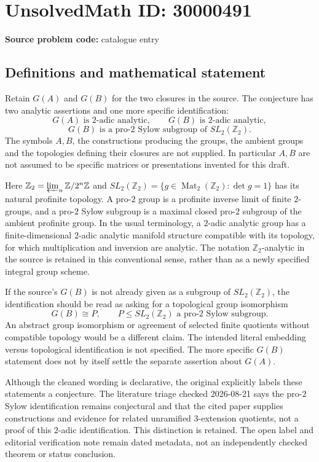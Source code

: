 \documentclass[11pt]{article}
\newcommand{\Z}{\mathbb{Z}}
\begin{document}
\section*{UnsolvedMath ID: 30000491}
\textbf{Source problem code:} catalogue entry
\subsection{Definitions and mathematical statement}
Retain \(G(A)\) and \(G(B)\) for the two closures in the source. The conjecture has two analytic assertions and one more specific identification:
\[
 G(A)\text{ is }2\text{-adic analytic},\qquad
 G(B)\text{ is }2\text{-adic analytic},
\]
\[
 G(B)\text{ is a pro-}2\text{ Sylow subgroup of }SL_2(\Z_2).
\]
The symbols \(A,B\), the constructions producing the groups, the ambient groups and the topologies defining their closures are not supplied. In particular \(A,B\) are not assumed to be specific matrices or presentations invented for this draft.

Here \(\Z_2=\varprojlim_n\Z/2^n\Z\) and \(SL_2(\Z_2)=\{g\in\operatorname{Mat}_2(\Z_2):\det g=1\}\) has its natural profinite topology. A pro-\(2\) group is a profinite inverse limit of finite \(2\)-groups, and a pro-\(2\) Sylow subgroup is a maximal closed pro-\(2\) subgroup of the ambient profinite group. In the usual terminology, a \(2\)-adic analytic group has a finite-dimensional \(2\)-adic analytic manifold structure compatible with its topology, for which multiplication and inversion are analytic. The notation \(\Z_2\)-analytic in the source is retained in this conventional sense, rather than as a newly specified integral group scheme.

If the source's \(G(B)\) is not already given as a subgroup of \(SL_2(\Z_2)\), the identification should be read as asking for a topological group isomorphism
\[
 G(B)\cong P,\qquad P\leq SL_2(\Z_2)\text{ a pro-}2\text{ Sylow subgroup}.
\]
An abstract group isomorphism or agreement of selected finite quotients without compatible topology would be a different claim. The intended literal embedding versus topological identification is not specified. The more specific \(G(B)\) statement does not by itself settle the separate assertion about \(G(A)\).

Although the cleaned wording is declarative, the original explicitly labels these statements a conjecture. The literature triage checked 2026-08-21 says the pro-\(2\) Sylow identification remains conjectural and that the cited paper supplies constructions and evidence for related unramified \(3\)-extension quotients, not a proof of this \(2\)-adic identification. This distinction is retained. The open label and editorial verification note remain dated metadata, not an independently checked theorem or status conclusion.
\end{document}
